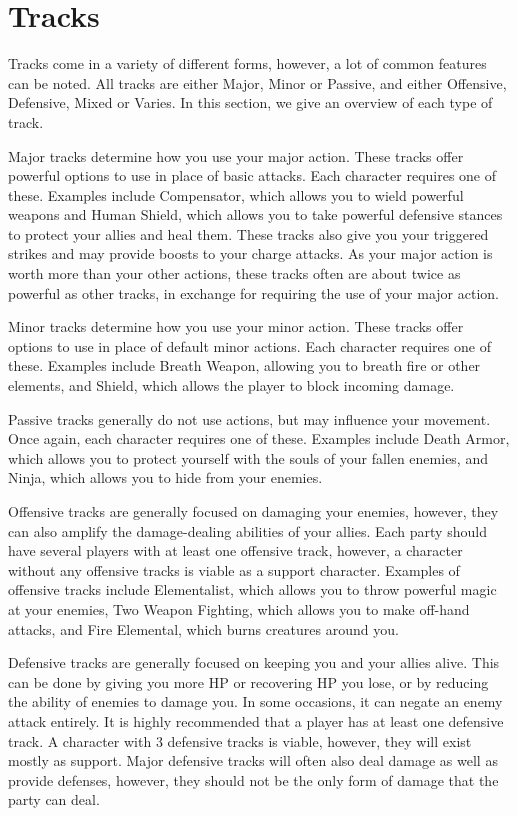 \chapter{Tracks}
\begin{multicols*}{2}
Tracks come in a variety of different forms, however, a lot of common features can be noted. All tracks are either Major, Minor or Passive, and either Offensive, Defensive, Mixed or Varies. In this section, we give an overview of each type of track.

Major tracks determine how you use your major action. These tracks offer powerful options to use in place of basic attacks. Each character requires one of these. Examples include Compensator, which allows you to wield powerful weapons and Human Shield, which allows you to take powerful defensive stances to protect your allies and heal them. These tracks also give you your triggered strikes and may provide boosts to your charge attacks. As your major action is worth more than your other actions, these tracks often are about twice as powerful as other tracks, in exchange for requiring the use of your major action.

Minor tracks determine how you use your minor action. These tracks offer options to use in place of default minor actions. Each character requires one of these. Examples include Breath Weapon, allowing you to breath fire or other elements, and Shield, which allows the player to block incoming damage.

Passive tracks generally do not use actions, but may influence your movement. Once again, each character requires one of these. Examples include Death Armor, which allows you to protect yourself with the souls of your fallen enemies, and Ninja, which allows you to hide from your enemies.

Offensive tracks are generally focused on damaging your enemies, however, they can also amplify the damage-dealing abilities of your allies. Each party should have several players with at least one offensive track, however, a character without any offensive tracks is viable as a support character. Examples of offensive tracks include Elementalist, which allows you to throw powerful magic at your enemies, Two Weapon Fighting, which allows you to make off-hand attacks, and Fire Elemental, which burns creatures around you.

Defensive tracks are generally focused on keeping you and your allies alive. This can be done by giving you more HP or recovering HP you lose, or by reducing the ability of enemies to damage you. In some occasions, it can negate an enemy attack entirely. It is highly recommended that a player has at least one defensive track. A character with 3 defensive tracks is viable, however, they will exist mostly as support. Major defensive tracks will often also deal damage as well as provide defenses, however, they should not be the only form of damage that the party can deal.


\end{multicols*}
